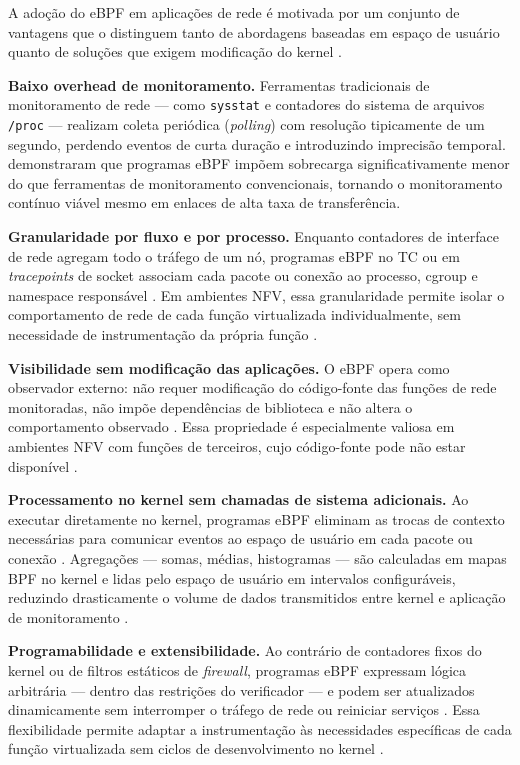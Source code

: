 A adoção do eBPF em aplicações de rede é motivada por um conjunto de vantagens
que o distinguem tanto de abordagens baseadas em espaço de usuário quanto de
soluções que exigem modificação do kernel \cite{cassagnes2020}.

\textbf{Baixo overhead de monitoramento.}
Ferramentas tradicionais de monitoramento de rede --- como \texttt{sysstat}
\cite{godard2024} e contadores do sistema de arquivos \texttt{/proc}
\cite{manpages2024} --- realizam coleta periódica (\textit{polling}) com resolução
tipicamente de um segundo, perdendo eventos de curta duração e introduzindo
imprecisão temporal.
 demonstraram que programas eBPF impõem sobrecarga
significativamente menor do que ferramentas de monitoramento convencionais,
tornando o monitoramento contínuo viável mesmo em enlaces de alta taxa de
transferência.

\textbf{Granularidade por fluxo e por processo.}
Enquanto contadores de interface de rede agregam todo o tráfego de um nó,
programas eBPF no TC ou em \textit{tracepoints} de socket associam cada pacote
ou conexão ao processo, cgroup e namespace responsável \cite{linuxkernel2024}.
Em ambientes NFV, essa granularidade permite isolar o comportamento de rede de
cada função virtualizada individualmente, sem necessidade de instrumentação da
própria função \cite{venancio2021}.

\textbf{Visibilidade sem modificação das aplicações.}
O eBPF opera como observador externo: não requer modificação do código-fonte das
funções de rede monitoradas, não impõe dependências de biblioteca e não altera o
comportamento observado \cite{gregg2019}.
Essa propriedade é especialmente valiosa em ambientes NFV com funções de terceiros,
cujo código-fonte pode não estar disponível \cite{etsi2014}.

\textbf{Processamento no kernel sem chamadas de sistema adicionais.}
Ao executar diretamente no kernel, programas eBPF eliminam as trocas de contexto
necessárias para comunicar eventos ao espaço de usuário em cada pacote ou conexão
\cite{linuxkernel2024}.
Agregações --- somas, médias, histogramas --- são calculadas em mapas BPF no
kernel e lidas pelo espaço de usuário em intervalos configuráveis, reduzindo
drasticamente o volume de dados transmitidos entre kernel e aplicação de
monitoramento \cite{gregg2020}.

\textbf{Programabilidade e extensibilidade.}
Ao contrário de contadores fixos do kernel ou de filtros estáticos de
\textit{firewall}, programas eBPF expressam lógica arbitrária --- dentro das
restrições do verificador --- e podem ser atualizados dinamicamente sem
interromper o tráfego de rede ou reiniciar serviços \cite{linuxkernel2024}.
Essa flexibilidade permite adaptar a instrumentação às necessidades específicas
de cada função virtualizada sem ciclos de desenvolvimento no kernel
\cite{alves2026tcc}.

